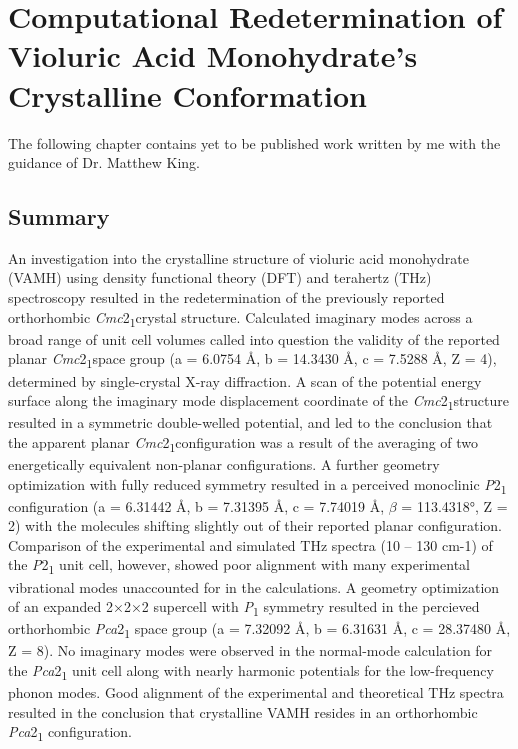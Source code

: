 \chapter{Computational Redetermination of Violuric Acid Monohydrate's Crystalline Conformation}
The following chapter contains yet to be published work written by me with the guidance of Dr. Matthew King. 
\label{chap:VAMH}
\section{Summary}
An investigation into the crystalline structure of violuric acid monohydrate (VAMH) using density functional theory (DFT) and terahertz (THz) spectroscopy resulted in the redetermination of the previously reported orthorhombic \textit{Cmc}2\textsubscript{1}crystal structure. Calculated imaginary modes across a broad range of unit cell volumes called into question the validity of the reported planar \textit{Cmc}2\textsubscript{1}space group (a = 6.0754 \r{A}, b = 14.3430 \r{A}, c = 7.5288 \r{A}, Z = 4), determined by single-crystal X-ray diffraction. A scan of the potential energy surface along the imaginary mode displacement coordinate of the \textit{Cmc}2\textsubscript{1}structure resulted in a symmetric double-welled potential, and led to the conclusion that the apparent planar \textit{Cmc}2\textsubscript{1}configuration was a result of the averaging of two energetically equivalent non-planar configurations. A further geometry optimization with fully reduced symmetry resulted in a perceived monoclinic \textit{P}2\textsubscript{1} configuration (a = 6.31442 \r{A}, b = 7.31395 \r{A}, c = 7.74019 \r{A}, \(\beta\) = 113.4318°, Z = 2) with the molecules shifting slightly out of their reported planar configuration. Comparison of the experimental and simulated THz spectra (10 – 130 cm-1) of the \textit{P}2\textsubscript{1} unit cell, however, showed poor alignment with many experimental vibrational modes unaccounted for in the calculations. A geometry optimization of an expanded 2×2×2 supercell with \textit{P}\textsubscript{1} symmetry resulted in the percieved orthorhombic \textit{Pca}2\textsubscript{1} space group (a = 7.32092 \r{A}, b = 6.31631 \r{A}, c = 28.37480 \r{A}, Z = 8). No imaginary modes were observed in the normal-mode calculation for the \textit{Pca}2\textsubscript{1} unit cell along with nearly harmonic potentials for the low-frequency phonon modes. Good alignment of the experimental and theoretical THz spectra resulted in the conclusion that crystalline VAMH resides in an orthorhombic \textit{Pca}2\textsubscript{1} configuration. 

